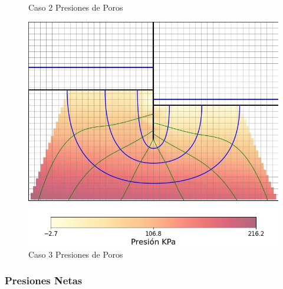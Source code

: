 \begin{figure}[H]
\begin{minipage}{0.32\textwidth}
      \caption{Caso 2 Presiones de Poros}
  \end{minipage}
  \begin{minipage}{0.32\textwidth}
      \centering
      \includegraphics[width=\textwidth]{FOTOS/caso_3_mapa_calor.jpg}
      \caption{Caso 3 Presiones de Poros}
  \end{minipage}
\end{figure}

\subsubsection{Presiones Netas}

